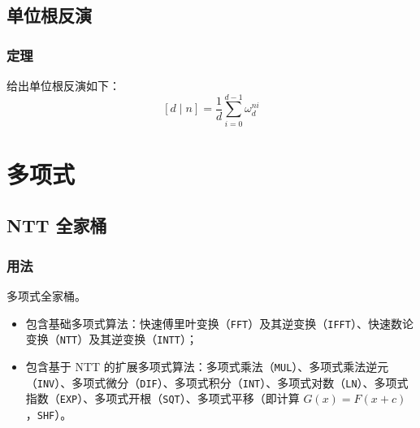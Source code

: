 \documentclass[10pt]{ctexart}
\providecommand{\tightlist}{\setlength{\itemsep}{0pt}\setlength{\parskip}{0pt}}
\newcommand{\passthrough}[1]{#1}
\begin{document}
\begin{multicols}{3}
    \subsection{单位根反演}\label{ux5355ux4f4dux6839ux53cdux6f14}

    \subsubsection{定理}\label{ux5b9aux7406-3}

    给出单位根反演如下：\[
    [d\mid n] = \frac{1}{d}\sum_{i=0}^{d-1}\omega_{d}^{ni}
    \]

    \section{多项式}\label{ux591aux9879ux5f0f}

    \subsection{NTT 全家桶}\label{ntt-ux5168ux5bb6ux6876}

    \subsubsection{用法}\label{ux7528ux6cd5-17}

    多项式全家桶。

    \begin{itemize}
    \tightlist
    \item
      包含基础多项式算法：快速傅里叶变换（\passthrough{\lstinline!FFT!}）及其逆变换（\passthrough{\lstinline!IFFT!}）、快速数论变换（\passthrough{\lstinline!NTT!}）及其逆变换（\passthrough{\lstinline!INTT!}）；
    \item
      包含基于 NTT
      的扩展多项式算法：多项式乘法（\passthrough{\lstinline!MUL!}）、多项式乘法逆元（\passthrough{\lstinline!INV!}）、多项式微分（\passthrough{\lstinline!DIF!}）、多项式积分（\passthrough{\lstinline!INT!}）、多项式对数（\passthrough{\lstinline!LN!}）、多项式指数（\passthrough{\lstinline!EXP!}）、多项式开根（\passthrough{\lstinline!SQT!}）、多项式平移（即计算
      \(G(x) = F(x + c)\)，\passthrough{\lstinline!SHF!}）。
    \end{itemize}


\end{multicols}
\end{document}
